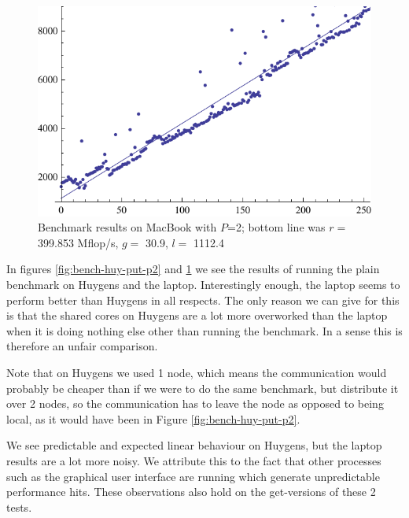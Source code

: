 \documentclass[a4paper]{article}
\begin{document}
\begin{figure}[h]
    \begin{center}
        \includegraphics{img/bench-laptop-put.pdf}
    \end{center}
    \caption{Benchmark results on MacBook with $P$=2; bottom line was  $r=$
    399.853 Mflop/s, $g=$ 30.9, $l=$ 1112.4 }
    \label{fig:bench-laptop-put-p2}
\end{figure}

In figures \ref{fig:bench-huy-put-p2} and \ref{fig:bench-laptop-put-p2} we see
the results of running the plain benchmark on Huygens and the laptop.
Interestingly enough, the laptop seems to perform better than Huygens in all
respects. The only reason we can give for this is that the shared cores on
Huygens are a lot more overworked than the laptop when it is doing nothing else
other than running the benchmark. In a sense this is therefore an unfair
comparison.

Note that on Huygens we used 1 node, which means the communication would
probably be cheaper than if we were to do the same benchmark, but distribute it
over 2 nodes, so the communication has to leave the node as opposed to being
local, as it would have been in Figure  \ref{fig:bench-huy-put-p2}. 

We see predictable and expected linear behaviour on Huygens, but the laptop
results are a
lot more noisy. We attribute this to the fact that other processes such as the
graphical user interface are running which generate unpredictable performance
hits. These observations also hold on the get-versions of these 2 tests.
\end{document}
